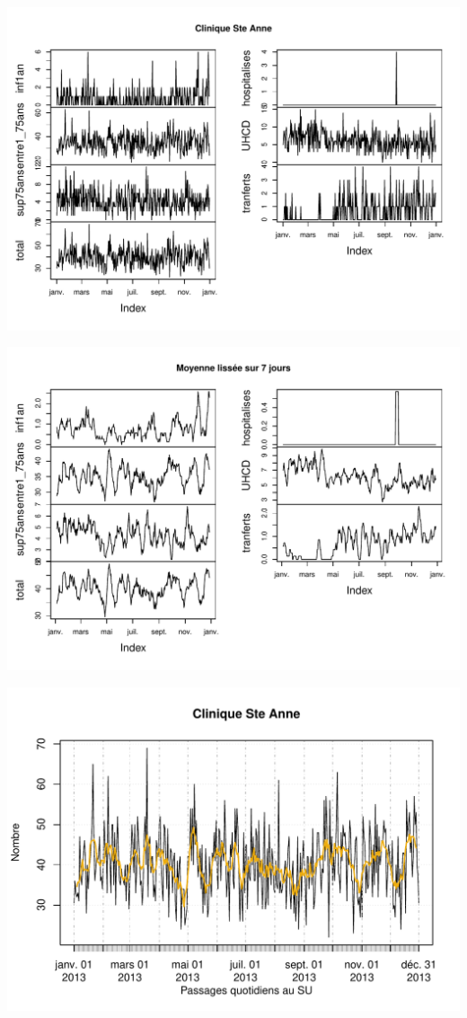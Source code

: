 \documentclass[12pt,english,french,twoside]{book}\usepackage[]{graphicx}\usepackage[]{color}
\makeatletter
\def\maxwidth{ %
  \ifdim\Gin@nat@width>\linewidth
    \linewidth
  \else
    \Gin@nat@width
  \fi
}
\newenvironment{knitrout}{}{} %
\makeatother
\begin{document}
\begin{knitrout}
\color{fgcolor}
\includegraphics[width=\maxwidth]{figure/stAnne_tx_moyen_passages1} 

\includegraphics[width=\maxwidth]{figure/stAnne_tx_moyen_passages2} 

\includegraphics[width=\maxwidth]{figure/stAnne_tx_moyen_passages3} 

\end{knitrout}
\end{document}
